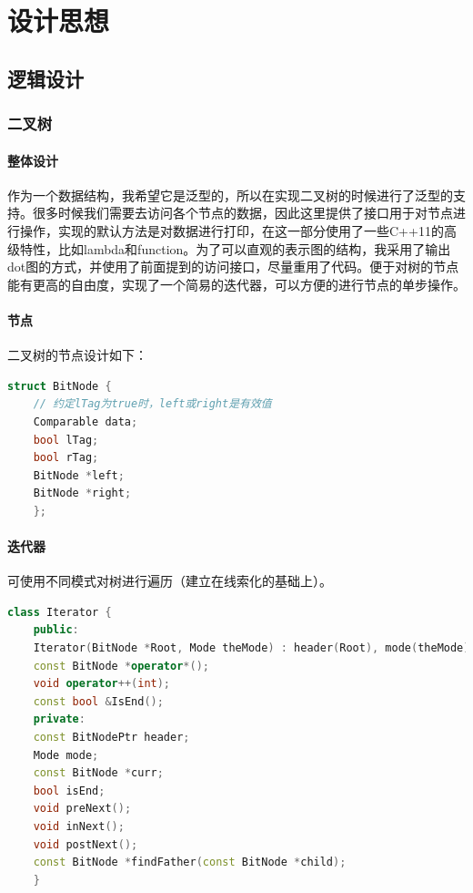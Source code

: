 \section{设计思想}
\subsection{逻辑设计}
\subsubsection{二叉树}
\paragraph{整体设计}作为一个数据结构，我希望它是泛型的，所以在实现二叉树的时候进行了泛型的支持。很多时候我们需要去访问各个节点的数据，因此这里提供了接口用于对节点进行操作，实现的默认方法是对数据进行打印，在这一部分使用了一些C++11的高级特性，比如lambda和function。为了可以直观的表示图的结构，我采用了输出dot图的方式，并使用了前面提到的访问接口，尽量重用了代码。便于对树的节点能有更高的自由度，实现了一个简易的迭代器，可以方便的进行节点的单步操作。

\paragraph{节点}二叉树的节点设计如下：

\begin{lstlisting}[language = c++]
    struct BitNode {
    // 约定lTag为true时，left或right是有效值
    Comparable data;
    bool lTag;
    bool rTag;
    BitNode *left;
    BitNode *right;
    };
\end{lstlisting}

\paragraph{迭代器}可使用不同模式对树进行遍历（建立在线索化的基础上）。

\begin{lstlisting}[language = c++]
    class Iterator {
    public:
    Iterator(BitNode *Root, Mode theMode) : header(Root), mode(theMode), isEnd(header == nullptr);
    const BitNode *operator*();
    void operator++(int);
    const bool &IsEnd();
    private:
    const BitNodePtr header;
    Mode mode;
    const BitNode *curr;
    bool isEnd;
    void preNext();
    void inNext();
    void postNext();
    const BitNode *findFather(const BitNode *child);
    }
\end{lstlisting}

